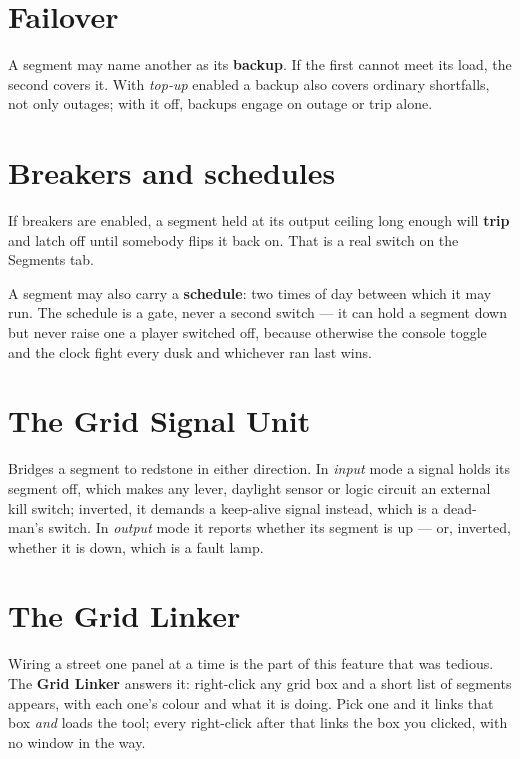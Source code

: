 \section{Failover}

A segment may name another as its \textbf{backup}. If the first cannot meet its load, the second
covers it. With \emph{top-up} enabled a backup also covers ordinary shortfalls, not only outages;
with it off, backups engage on outage or trip alone.

\section{Breakers and schedules}

If breakers are enabled, a segment held at its output ceiling long enough will \textbf{trip} and
latch off until somebody flips it back on. That is a real switch on the Segments tab.

A segment may also carry a \textbf{schedule}: two times of day between which it may run. The
schedule is a gate, never a second switch --- it can hold a segment down but never raise one a
player switched off, because otherwise the console toggle and the clock fight every dusk and
whichever ran last wins.

\section{The Grid Signal Unit}

Bridges a segment to redstone in either direction. In \emph{input} mode a signal holds its segment
off, which makes any lever, daylight sensor or logic circuit an external kill switch; inverted, it
demands a keep-alive signal instead, which is a dead-man's switch. In \emph{output} mode it reports
whether its segment is up --- or, inverted, whether it is down, which is a fault lamp.

\section{The Grid Linker}

Wiring a street one panel at a time is the part of this feature that was tedious. The
\textbf{Grid Linker} answers it: right-click any grid box and a short list of segments appears, with
each one's colour and what it is doing. Pick one and it links that box \emph{and} loads the tool;
every right-click after that links the box you clicked, with no window in the way.

